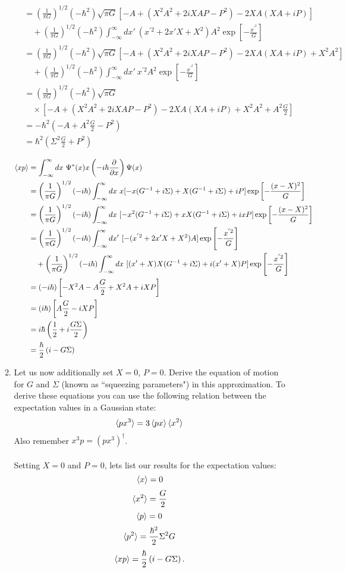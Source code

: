 \documentclass[11pt,letterpaper]{article}
\begin{document}
\begin{enumerate}
\begin{enumerate}
\begin{align*}
&=\left(\frac{1}{\pi G}\right)^{1/2}(-\hbar^2)\sqrt{\pi G}[-A+(X^2A^2+2iXAP-P^2)-2XA(XA+iP)]\\
&\quad+\left(\frac{1}{\pi G}\right)^{1/2}(-\hbar^2)\int_{-\infty}^{\infty}{dx'\ (x^{'2}+2x'X+X^2)A^2\exp{\left[-\frac{x^{'^2}}{G}\right]}}\\
&=\left(\frac{1}{\pi G}\right)^{1/2}(-\hbar^2)\sqrt{\pi G}[-A+(X^2A^2+2iXAP-P^2)-2XA(XA+iP)+X^2A^2]\\
&\quad+\left(\frac{1}{\pi G}\right)^{1/2}(-\hbar^2)\int_{-\infty}^{\infty}{dx'\ x^{'2}A^2\exp{\left[-\frac{x^{'^2}}{G}\right]}}\\
&=\left(\frac{1}{\pi G}\right)^{1/2}(-\hbar^2)\sqrt{\pi G}\\
&\quad\times\left[-A+(X^2A^2+2iXAP-P^2)-2XA(XA+iP)+X^2A^2+A^2\frac{G}{2}\right]\\
&=-\hbar^2\left(-A+A^2\frac{G}{2}-P^2\right)\\
&= \hbar^2\left(\Sigma^2\frac{G}{2}+P^2\right)
\end{align*}

\begin{align*}\braket{xp} &= \int_{-\infty}^{\infty}{dx\ \Psi^*(x)x\left(-i\hbar\frac{\partial}{\partial x}\right)\Psi(x)}\\
&=\left(\frac{1}{\pi G}\right)^{1/2}(-i\hbar)\int_{-\infty}^{\infty}{dx\ x[-x(G^{-1}+i\Sigma)+X(G^{-1}+i\Sigma)+iP]\exp{\left[-\frac{(x-X)^2}{G}\right]}}\\
&=\left(\frac{1}{\pi G}\right)^{1/2}(-i\hbar)\int_{-\infty}^{\infty}{dx\ [-x^2(G^{-1}+i\Sigma)+xX(G^{-1}+i\Sigma)+ixP]\exp{\left[-\frac{(x-X)^2}{G}\right]}}\\
&=\left(\frac{1}{\pi G}\right)^{1/2}(-i\hbar)\int_{-\infty}^{\infty}{dx'\ [-(x^{'2}+2x'X+X^2)A]\exp{\left[-\frac{x^{'2}}{G}\right]}}\\
&\quad+\left(\frac{1}{\pi G}\right)^{1/2}(-i\hbar)\int_{-\infty}^{\infty}{dx\ [(x'+X)X(G^{-1}+i\Sigma)+i(x'+X)P]\exp{\left[-\frac{x^{'2}}{G}\right]}}\\
&=(-i\hbar)\left[-X^2A-A\frac{G}{2}+X^2A+iXP\right]\\
&=(i\hbar)\left[A\frac{G}{2}-iXP\right]\\
&=i\hbar\left(\frac{1}{2}+i\frac{G\Sigma}{2}\right)\\
&=\frac{\hbar}{2}\left(i-G\Sigma\right)
\end{align*}

\item Let us now additionally set $X=0$, $P=0$. Derive the equation of motion for $G$ and $\Sigma$ (known as ``squeezing parameters") in this approximation. To derive these equations you can use the following relation between the expectation values in a Gaussian state:
$$\braket{px^3}=3\braket{px}\braket{x^2}$$
Also remember $x^3p = (px^3)^\dag$. 
\\ \\Setting $X=0$ and $P=0$, lets list our results for the expectation values:
$$\braket{x} = 0$$
$$\braket{x^2} = \frac{G}{2}$$
$$\braket{p} = 0$$
$$\braket{p^2} = \frac{\hbar^2}{2}\Sigma^2G$$
$$\braket{xp} = \frac{\hbar}{2}\left(i-G\Sigma\right).$$


\end{enumerate}
\end{enumerate}
\end{document}
